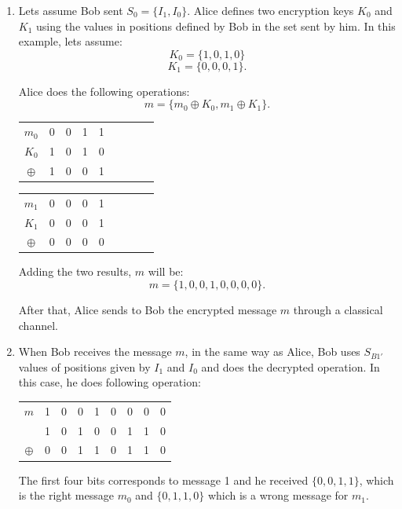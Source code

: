 \begin{enumerate}
  \item Lets assume Bob sent $S_{0}=\{I_{1},I_{0} \}$.
   Alice defines two encryption keys $K_{0}$ and $K_{1}$ using the values in positions defined by Bob in the set sent by him. In this example, lets assume: $$K_{0}=\{1,0,1,0\}$$ $$K_{1}=\{0,0,0,1\}.$$

   Alice does the following operations:
   $$m = \{m_{0}\oplus K_{0}, m_{1} \oplus K_{1} \}.$$

   \begin{table}[H]
    \centering
    \begin{tabular}{c|c c c c c c c c}
     $m_{0}$ & 0 & 0 & 1 & 1 \\
     $K_{0}$ & 1 & 0 & 1 & 0 \\ \hline
     $\oplus$ & 1 & 0 & 0 & 1
    \end{tabular}
    \end{table}

   \begin{table}[H]
    \centering
    \begin{tabular}{c|c c c c c c c c}
     $m_{1}$ & 0 & 0 & 0 & 1 \\
     $K_{1}$ & 0 & 0 & 0 & 1 \\ \hline
     $\oplus$ & 0 & 0 & 0 & 0
    \end{tabular}
    \end{table}

    Adding the two results, $m$ will be: $$m=\{1,0,0,1,0,0,0,0\}.$$

   After that, Alice sends to Bob the encrypted message $m$ through a classical channel.

  \item When Bob receives the message $m$, in the same way as Alice, Bob uses $S_{B1\prime}$ values of positions given by $I_{1}$ and $I_{0}$ and does the decrypted operation. In this case, he does following operation:

      \begin{table}[H]
        \centering
        \begin{tabular}{c|c c c c c c c c}
         $m$ & 1 & 0 & 0 & 1 & 0 & 0 & 0 & 0 \\
             & 1 & 0 & 1 & 0 & 0 & 1 & 1 & 0 \\ \hline
         $\oplus$ & 0 & 0 & 1 & 1 & 0 & 1 & 1 & 0 \\
        \end{tabular}
        \end{table}

      The first four bits corresponds to message 1 and he received $\{0,0,1,1\}$, which is the right message $m_{0}$ and $\{0,1,1,0\}$ which is a wrong message for $m_{1}$.


\end{enumerate}


